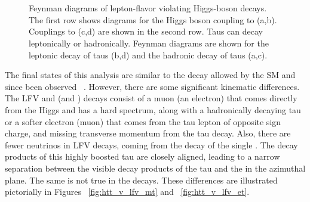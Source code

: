 \begin{figure}[htbp]
  \centering
   \\
   \\
  \caption{Feynman diagrams of lepton-flavor violating Higgs-boson decays. The first row shows diagrams for the Higgs boson coupling to \mutau (a,b). Couplings to \etau (c,d) are shown in the second row. Taus can decay leptonically or hadronically. Feynman diagrams are shown for the leptonic decay of taus (b,d) and the hadronic decay of taus (a,c).}
  \label{fig:feynman}
\end{figure}

The final states of this analysis are similar to the \Htt decay allowed by the SM and since been observed ~\cite{Sirunyan:2017khh}. However, there are some significant kinematic differences. The LFV \Hmuhad and \Hmue (\Hehad and \Hemu) decays consist of a muon (an electron) that comes directly from the Higgs and has a hard \pt spectrum, along with a hadronically decaying tau or a softer electron (muon) that comes from the tau lepton of opposite sign charge, and missing transverse momentum from the tau decay. Also, there are fewer neutrinos in LFV decays, coming from the decay of the single \Pgt. The decay products of this highly boosted tau are closely aligned, leading to a narrow separation between the visible decay products of the tau and the \ptvecmiss in the azimuthal plane. The same is not true in the \Htt decays. These differences are illustrated pictorially in Figures ~\ref{fig:htt_v_lfv_mt} and ~\ref{fig:htt_v_lfv_et}.

